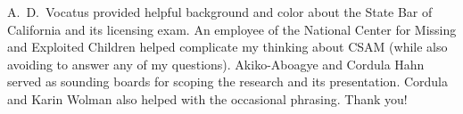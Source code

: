 \documentclass[authorversion,nonacm,screen]{acmart}
\begin{document}








\begin{acks}
A.\ D.\ Vocatus provided helpful background and color about the State Bar of
California and its licensing exam. An employee of the National Center for
Missing and Exploited Children helped complicate my thinking about CSAM (while
also avoiding to answer any of my questions). Akiko-Aboagye and Cordula Hahn
served as sounding boards for scoping the research and its presentation. Cordula
and Karin Wolman also helped with the occasional phrasing. Thank you!
\end{acks}





\newpage
\appendix







\end{document}
